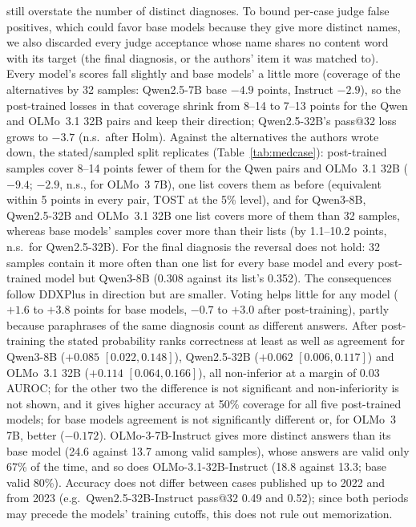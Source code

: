 \documentclass[wcp]{jmlr}
\begin{document}
still overstate the number of distinct diagnoses. To bound per-case judge false positives, which could favor base models because they give more distinct names, we also discarded every judge acceptance whose name shares no content word with its target (the final diagnosis, or the authors' item it was matched to). Every model's scores fall slightly and base models' a little more (coverage of the alternatives by 32 samples: Qwen2.5-7B base $-4.9$ points, Instruct $-2.9$), so the post-trained losses in that coverage shrink from 8--14 to 7--13 points for the Qwen and OLMo~3.1 32B pairs and keep their direction; Qwen2.5-32B's pass@32 loss grows to $-3.7$ (n.s.\ after Holm).
Against the alternatives the authors wrote down, the stated/sampled split replicates (Table~\ref{tab:medcase}): post-trained samples cover 8--14 points fewer of them for the Qwen pairs and OLMo~3.1 32B ($-9.4$; $-2.9$, n.s., for OLMo~3 7B), one list covers them as before (equivalent within 5 points in every pair, TOST at the 5\% level), and for Qwen3-8B, Qwen2.5-32B and OLMo~3.1 32B one list covers more of them than 32 samples, whereas base models' samples cover more than their lists (by 1.1--10.2 points, n.s.\ for Qwen2.5-32B). For the final diagnosis the reversal does not hold: 32 samples contain it more often than one list for every base model and every post-trained model but Qwen3-8B (0.308 against its list's 0.352). The consequences follow DDXPlus in direction but are smaller. Voting helps little for any model ($+1.6$ to $+3.8$ points for base models, $-0.7$ to $+3.0$ after post-training), partly because paraphrases of the same diagnosis count as different answers. After post-training the stated probability ranks correctness at least as well as agreement for Qwen3-8B ($+0.085$ $[0.022,0.148]$), Qwen2.5-32B ($+0.062$ $[0.006,0.117]$) and OLMo~3.1 32B ($+0.114$ $[0.064,0.166]$), all non-inferior at a margin of 0.03 AUROC; for the other two the difference is not significant and non-inferiority is not shown, and it gives higher accuracy at 50\% coverage for all five post-trained models; for base models agreement is not significantly different or, for OLMo~3 7B, better ($-0.172$). OLMo-3-7B-Instruct gives more distinct answers than its base model (24.6 against 13.7 among valid samples), whose answers are valid only 67\% of the time, and so does OLMo-3.1-32B-Instruct (18.8 against 13.3; base valid 80\%). Accuracy does not differ between cases published up to 2022 and from 2023 (e.g.\ Qwen2.5-32B-Instruct pass@32 0.49 and 0.52); since both periods may precede the models' training cutoffs, this does not rule out memorization.
\end{document}
